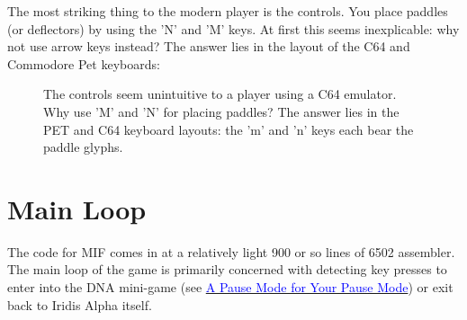 The most striking thing to the modern player is the controls. You place paddles (or deflectors) by using the 'N' and 'M' keys. At first
this seems inexplicable: why not use arrow keys instead? The answer lies in the layout of the C64 and Commodore Pet keyboards: 
\begin{figure}[H]
  {
    \setlength{\tabcolsep}{3.0pt}
    \setlength\cmidrulewidth{\heavyrulewidth} %
	\centering
	\begin{subfigure}{0.5\textwidth}
	\end{subfigure}
	\begin{subfigure}{0.5\textwidth}
	\end{subfigure}
  }
\caption{ The controls seem unintuitive to a player using a C64 emulator. Why use 'M' and 'N' for placing paddles? The answer lies in the PET
and C64 keyboard layouts: the 'm' and 'n' keys each bear the paddle glyphs.
}
\end{figure}

\section{Main Loop}
The code for MIF comes in at a relatively light 900 or so lines of 6502
assembler. The main loop of the game is primarily concerned with detecting key
presses to enter into the DNA mini-game (see
\hyperref[sec:dna]{\textcolor{blue}{A Pause Mode for Your Pause Mode}}) or exit
back to Iridis Alpha itself.

